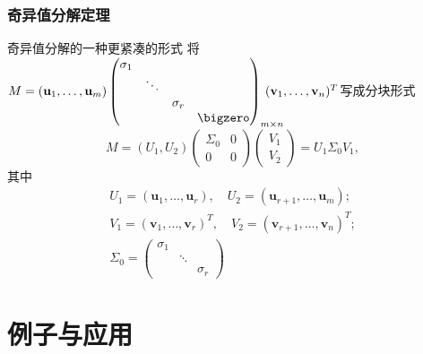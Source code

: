 
\begin{frame}
\frametitle{奇异值分解定理}

\begin{block}{奇异值分解的一种更紧凑的形式}
将$M = (\mathbf{u}_1,\ldots,\mathbf{u}_m) \begin{pmatrix}
\sigma_1 & & & \\ & \ddots & & \\ & & \sigma_r & \\ & & & \bigzero \end{pmatrix}_{m\times n}\!\!\!\!\!\!\!\!\!\!(\mathbf{v}_1,\ldots,\mathbf{v}_n)^T$写成分块形式
$$M = (U_1, U_2) \begin{pmatrix} \Sigma_0 & 0 \\ 0 & 0 \end{pmatrix} \begin{pmatrix} V_1 \\ V_2 \end{pmatrix} = U_1\Sigma_0V_1,$$
其中
\begin{gather*}
U_1 = (\mathbf{u}_1,\ldots,\mathbf{u}_r), \quad U_2 = (\mathbf{u}_{r+1},\ldots,\mathbf{u}_m); \\
V_1 = (\mathbf{v}_1,\ldots,\mathbf{v}_r)^T, \quad V_2 = (\mathbf{v}_{r+1},\ldots,\mathbf{v}_n)^T; \\
\Sigma_0 = \begin{pmatrix}
\sigma_1 & & \\ & \ddots & \\ & & \sigma_r \end{pmatrix}
\end{gather*}

\end{block}

\end{frame}


\section{例子与应用}


